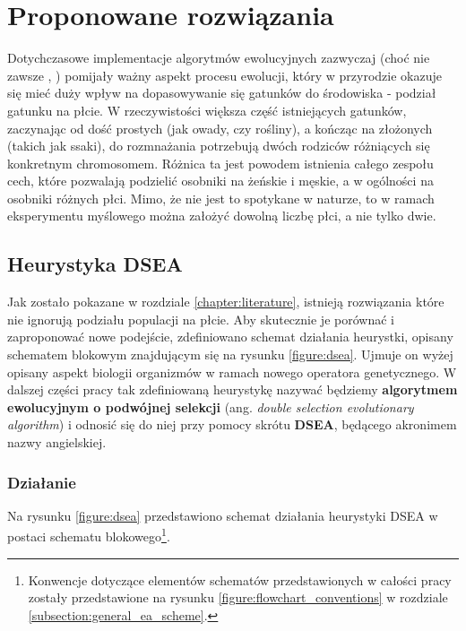 \documentclass[twoside]{iisthesis}
\begin{document}
\chapter{Proponowane rozwiązania} \label{chapter:proposed}

Dotychczasowe implementacje algorytmów ewolucyjnych zazwyczaj (choć nie zawsze \cite{GGA}, \cite{SexualGA}) pomijały ważny aspekt procesu ewolucji, który w przyrodzie okazuje się mieć duży wpływ na dopasowywanie się gatunków do środowiska - podział gatunku na płcie. W rzeczywistości większa część istniejących gatunków, zaczynając od dość prostych (jak owady, czy rośliny), a kończąc na złożonych (takich jak ssaki), do rozmnażania potrzebują dwóch rodziców różniących się konkretnym chromosomem. Różnica ta jest powodem istnienia całego zespołu cech, które pozwalają podzielić osobniki na żeńskie i męskie, a w ogólności na osobniki różnych płci. Mimo, że nie jest to spotykane w naturze, to w ramach eksperymentu myślowego można założyć dowolną liczbę płci, a nie tylko dwie.

\section{Heurystyka DSEA} \label{section:dsea}

Jak zostało pokazane w rozdziale \ref{chapter:literature}, istnieją rozwiązania które nie ignorują podziału populacji na płcie. Aby skutecznie je porównać i zaproponować nowe podejście, zdefiniowano schemat działania heurystki, opisany schematem blokowym znajdującym się na rysunku \ref{figure:dsea}. Ujmuje on wyżej opisany aspekt biologii organizmów w ramach nowego operatora genetycznego. W dalszej części pracy tak zdefiniowaną heurystykę nazywać będziemy \textbf{algorytmem ewolucyjnym o podwójnej selekcji} (ang. \emph{double selection evolutionary algorithm}) i odnosić się do niej przy pomocy skrótu \textbf{DSEA}, będącego akronimem nazwy angielskiej.

\subsection{Działanie} \label{subsection:dsea_scheme}

Na rysunku \ref{figure:dsea} przedstawiono schemat działania heurystyki DSEA w postaci schematu blokowego\footnote{Konwencje dotyczące elementów schematów przedstawionych w całości pracy zostały przedstawione na rysunku \ref{figure:flowchart_conventions} w rozdziale \ref{subsection:general_ea_scheme}.}. 
\end{document}
